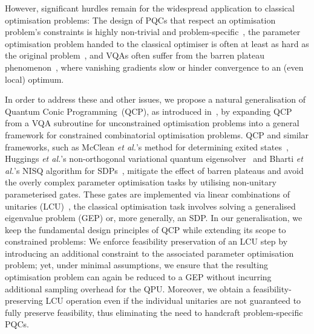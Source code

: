 \documentclass[10pt,conference]{IEEEtran}
\begin{document}
However, significant hurdles remain for the widespread application to classical optimisation problems:
The design of PQCs that respect an optimisation problem's constraints is highly non-trivial and problem-specific~\cite{Hadfield2019FromTheQuantumApproximateOptimizationAlgorithmToAQuantumAlternatingOperatorAnsatz}, the parameter optimisation problem handed to the classical optimiser is often at least as hard as the original problem~\cite{Bittel2021TrainingVariationalQuantumAlgorithmsIsNpHard}, and VQAs often suffer from the barren plateau phenomenon~\cite{Larocca2025BarrenPlateausInVariationalQuantumComputing}, where vanishing gradients slow or hinder convergence to an (even local) optimum.

In order to address these and other issues, we propose a natural generalisation of Quantum Conic Programming~(QCP), as introduced in~\cite{Binkowski2025FromBarrenPlateausThroughFertileValleysConicExtensionsOfParameterisedQuantumCircuits}, by expanding QCP from a VQA subroutine for unconstrained optimisation problems into a general framework for constrained combinatorial optimisation problems.
QCP and similar frameworks, such as McClean \textit{et al.}'s method for determining exited states~\cite{Mcclean2017HybridQuantumClassicalHierarchyForMitigationOfDecoherenceAndDeterminationOfExcitedStates}, Huggings \textit{et al.}'s non-orthogonal variational quantum eigensolver~\cite{Huggins2020ANonOrthogonalVariationalQuantumEigensolver} and Bharti \textit{et al.}'s NISQ algorithm for SDPs~\cite{Bharti2022NoisyIntermediateScaleQuantumAlgorithmForSemidefiniteProgramming}, mitigate the effect of barren plateaus and avoid the overly complex parameter optimisation tasks by utilising non-unitary parameterised gates.
These gates are implemented via linear combinations of unitaries (LCU)~\cite{Childs2012HamiltonianSimulationUsingLinearCombinationsOfUnitaryOperations},
the classical optimisation task involves solving a generalised eigenvalue problem (GEP) or, more generally, an SDP\@.
In our generalisation, we keep the fundamental design principles of QCP while extending its scope to constrained problems:
We enforce feasibility preservation of an LCU step by introducing an additional constraint to the associated parameter optimisation problem; yet, under minimal assumptions, we ensure that the resulting optimisation problem can again be reduced to a GEP without incurring additional sampling overhead for the QPU.
Moreover, we obtain a feasibility-preserving LCU operation even if the individual unitaries are not guaranteed to fully preserve feasibility, thus eliminating the need to handcraft problem-specific PQCs.
\end{document}
